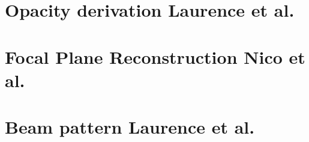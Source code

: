 \documentclass[a4paper, 11pt]{report}
\begin{document}
\clearpage
\chapter{Opacity derivation {\color{YellowGreen} Laurence et al.}}
\label{se:opacities}


\clearpage
\chapter{Focal Plane Reconstruction {\color{blue} Nico et al.}}
\label{se:fp_reconstruction}



\clearpage
\chapter{Beam pattern {\color{blue} Laurence et al.} }
\label{se:beams}

%


\clearpage
%


\clearpage
\end{document}
